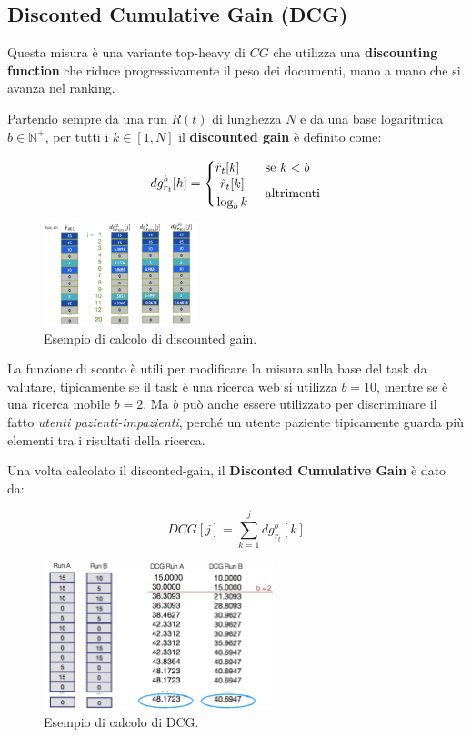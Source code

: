 \subsection{Disconted Cumulative Gain (DCG)}

Questa misura è una variante top-heavy di $CG$ che utilizza una \textbf{discounting function} che riduce progressivamente il peso dei documenti, mano a mano che si avanza nel ranking.

Partendo sempre da una run $R(t)$ di lunghezza $N$ e da una base logaritmica $b \in \mathbb{N}^+$, per tutti i $k \in [1,N]$ il \textbf{discounted gain} è definito come:

$$
dg_{r_t}^b[h] = \begin{cases}
\tilde{r}_t[k] \quad &\text{se } k < b \\
\cfrac{\tilde{r}_t[k]}{\log_b k} &\text{altrimenti}
\end{cases}
$$

\begin{figure}[htbp]
	\centering
	\includegraphics[width=0.4\textwidth]{images/l16-fig-4.png}
	\caption{Esempio di calcolo di discounted gain.}
\end{figure}

La funzione di sconto è utili per modificare la misura sulla base del task da valutare, tipicamente se il task è una ricerca web si utilizza $b=10$, mentre se è una ricerca mobile $b=2$.
Ma $b$ può anche essere utilizzato per discriminare il fatto \textit{utenti pazienti-impazienti}, perché un utente paziente tipicamente guarda più elementi tra i risultati della ricerca.

Una volta calcolato il disconted-gain, il \textbf{Disconted Cumulative Gain} è dato da:

$$
DCG[j] = \sum\limits_{k=1}^{j}dg_{r_t}^b[k]
$$


\begin{figure}[htbp]
	\centering
	\includegraphics[width=0.6\textwidth]{images/l16-fig-5.png}
	\caption{Esempio di calcolo di DCG.}
\end{figure}

